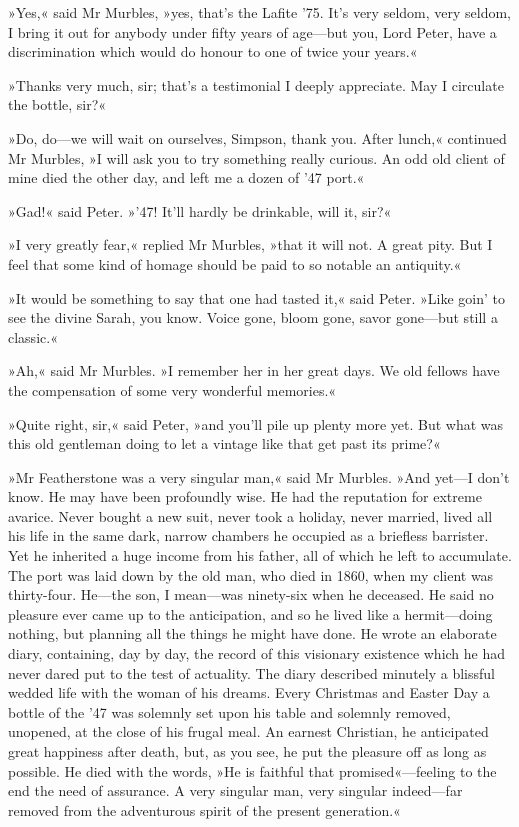 »Yes,« said Mr Murbles, »yes, that's the Lafite '75. It's very seldom, very seldom, I bring it out for anybody under fifty years of age—but you, Lord Peter, have a discrimination which would do honour to one of twice your years.«

»Thanks very much, sir; that's a testimonial I deeply appreciate. May I circulate the bottle, sir?«

»Do, do—we will wait on ourselves, Simpson, thank you. After lunch,« continued Mr Murbles, »I will ask you to try something really curious.  An odd old client of mine died the other day, and left me a dozen of '47 port.«

»Gad!« said Peter. »'47! It'll hardly be drinkable, will it, sir?«

»I very greatly fear,« replied Mr Murbles, »that it will not. A great pity. But I feel that some kind of homage should be paid to so notable an antiquity.«

»It would be something to say that one had tasted it,« said Peter. »Like goin' to see the divine Sarah, you know. Voice gone, bloom gone, savor gone—but still a classic.«

»Ah,« said Mr Murbles. »I remember her in her great days. We old fellows have the compensation of some very wonderful memories.«

»Quite right, sir,« said Peter, »and you'll pile up plenty more yet.  But what was this old gentleman doing to let a vintage like that get past its prime?«

»Mr Featherstone was a very singular man,« said Mr Murbles. »And yet—I don't know. He may have been profoundly wise. He had the reputation for extreme avarice. Never bought a new suit, never took a holiday, never married, lived all his life in the same dark, narrow chambers he occupied as a briefless barrister. Yet he inherited a huge income from his father, all of which he left to accumulate. The port was laid down by the old man, who died in 1860, when my client was thirty-four. He—the son, I mean—was ninety-six when he deceased. He said no pleasure ever came up to the anticipation, and so he lived like a hermit—doing nothing, but planning all the things he might have done. He wrote an elaborate diary, containing, day by day, the record of this visionary existence which he had never dared put to the test of actuality. The diary described minutely a blissful wedded life with the woman of his dreams. Every Christmas and Easter Day a bottle of the '47 was solemnly set upon his table and solemnly removed, unopened, at the close of his frugal meal. An earnest Christian, he anticipated great happiness after death, but, as you see, he put the pleasure off as long as possible. He died with the words, »He is faithful that promised«—feeling to the end the need of assurance. A very singular man, very singular indeed—far removed from the adventurous spirit of the present generation.«

